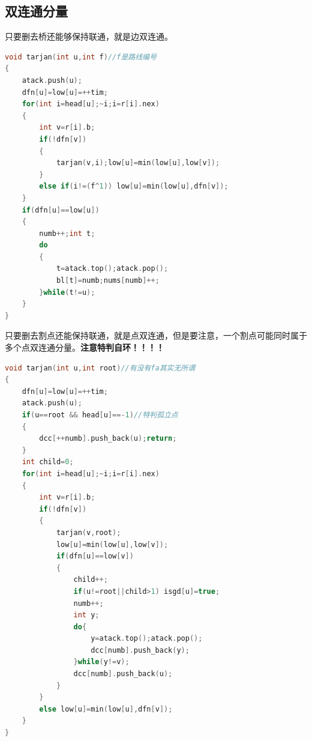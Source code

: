 \documentclass[a4paper]{book}
\begin{document}
\subsection{双连通分量}
只要删去桥还能够保持联通，就是边双连通。
\begin{lstlisting}[language=C++,title=边双连通分量]
void tarjan(int u,int f)//f是路线编号
{
    atack.push(u);
    dfn[u]=low[u]=++tim;
    for(int i=head[u];~i;i=r[i].nex)
    {
        int v=r[i].b;
        if(!dfn[v])
        {
            tarjan(v,i);low[u]=min(low[u],low[v]);
        }
        else if(i!=(f^1)) low[u]=min(low[u],dfn[v]);
    }
    if(dfn[u]==low[u])
    {
        numb++;int t;
        do
        {
            t=atack.top();atack.pop();
            bl[t]=numb;nums[numb]++;
        }while(t!=u);
    }
}
\end{lstlisting}
只要删去割点还能保持联通，就是点双连通，但是要注意，一个割点可能同时属于多个点双连通分量。\textbf{注意特判自环！！！！}
\begin{lstlisting}[language=C++,title=点双连通分量]
void tarjan(int u,int root)//有没有fa其实无所谓
{
    dfn[u]=low[u]=++tim;
    atack.push(u);
    if(u==root && head[u]==-1)//特判孤立点
    {
        dcc[++numb].push_back(u);return;
    }
    int child=0;
    for(int i=head[u];~i;i=r[i].nex)
    {
        int v=r[i].b;
        if(!dfn[v])
        {
            tarjan(v,root);
            low[u]=min(low[u],low[v]);
            if(dfn[u]==low[v])
            {
                child++;
                if(u!=root||child>1) isgd[u]=true;
                numb++;
                int y;
                do{
                    y=atack.top();atack.pop();
                    dcc[numb].push_back(y);
                }while(y!=v);
                dcc[numb].push_back(u);
            }
        }
        else low[u]=min(low[u],dfn[v]);
    }
}
\end{lstlisting}
\end{document}
